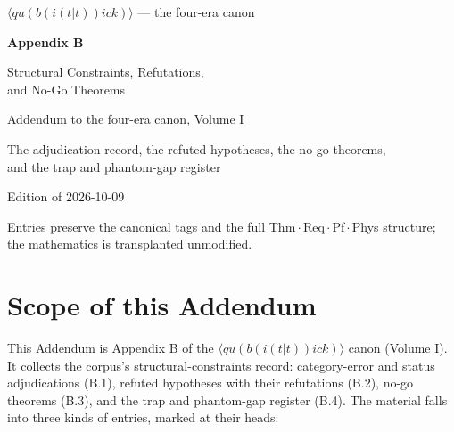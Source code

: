 \documentclass[11pt,openany]{report}
\theoremstyle{canonplain}
\theoremstyle{canondef}
\begin{document}
\begin{titlepage}
\centering
\vspace*{2.4cm}
{\LARGE $\langle qu(b(i(t|t))ick)\rangle$ — the four-era canon\par}
\vspace{0.8cm}
{\Huge\bfseries Appendix B\par}
\vspace{0.5cm}
{\LARGE Structural Constraints, Refutations,\\ and No-Go Theorems\par}
\vspace{1.0cm}
{\large Addendum to the four-era canon, Volume I\par}
\vspace{0.4cm}
{\large The adjudication record, the refuted hypotheses, the no-go theorems,\\ and the trap and phantom-gap register\par}
\vfill
{\large Edition of 2026-10-09\par}
\vspace{0.3cm}
{\small Entries preserve the canonical tags and the full Thm\,$\cdot$\,Req\,$\cdot$\,Pf\,$\cdot$\,Phys structure; the mathematics is transplanted unmodified.\par}
\end{titlepage}

\tableofcontents

\section*{\texorpdfstring{Scope of this Addendum}{Scope of this Addendum}}

This Addendum is Appendix B of the $\langle qu(b(i(t|t))ick)\rangle$ canon
(Volume I). It
collects the corpus's structural-constraints record: category-error and status
adjudications (B.1), refuted hypotheses with their refutations (B.2), no-go
theorems (B.3), and the trap and phantom-gap register (B.4). The material
falls into three kinds of entries, marked at their heads:
\end{document}
